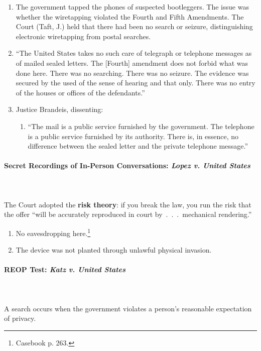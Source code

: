 \begin{enumerate}
    \item The government tapped the phones of suspected bootleggers. The issue 
    was whether the wiretapping violated the Fourth and Fifth Amendments. The 
    Court (Taft, J.) held that there had been no search or seizure, 
    distinguishing electronic wiretapping from postal searches.
    \item ``The United States takes no such care of telegraph or telephone 
    messages as of mailed sealed letters. The [Fourth] amendment does not 
    forbid what was done here. There was no searching. There was no seizure. 
    The evidence was secured by the used of the sense of hearing and that 
    only. There was no entry of the houses or offices of the defendants.''
    \item Justice Brandeis, dissenting:
    \begin{enumerate}
        \item ``The mail is a public service furnished by the government. The 
        telephone is a public service furnished by its authority. There is, in 
        essence, no difference between the sealed letter and the private 
        telephone message.''
    \end{enumerate}
\end{enumerate}

\paragraph{Secret Recordings of In-Person Conversations: \emph{Lopez v. United 
States}}
~\\\\
The Court adopted the \textbf{risk theory}: if you break the law, you run the 
risk that the offer ``will be accurately reproduced in court 
by~.~.~.~mechanical rendering.''

\begin{enumerate}
    \item No eavesdropping here.\footnote{Casebook p. 263.}
    \item The device was not planted through unlawful physical invasion.
\end{enumerate}

\paragraph{REOP Test: \emph{Katz v. United States}}
~\\\\
A search occurs when the government violates a person's reasonable 
expectation of privacy.

